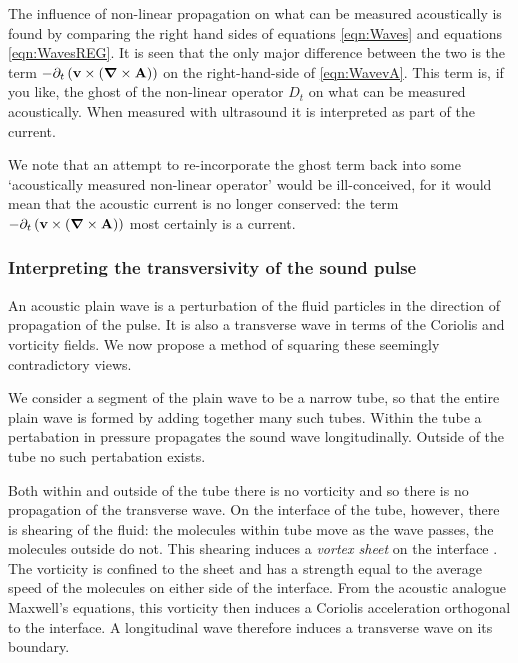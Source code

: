 \documentclass[10pt, fleqn,final,showtrims,oldfontcommands]{article} %
\newcommand{\eqnref}[1]{\ref{eqn:#1}}
\newcommand{\lr}[1]{\left( #1 \right)}
\renewcommand{\d}{\partial}
\newcommand{\del}{\nabla}
\newcommand{\vdel}{ \mbox{\boldmath $\del$}}
\newcommand{\dt}{{\d_t}}
\newcommand{\Dt}{D_t}
\newcommand{\vA}{\textbf{A}}
\newcommand{\vv}{\textbf{v}}
\begin{document}
The influence of non-linear propagation on what can be measured acoustically is found by comparing the right hand sides of equations \eqnref{Waves} and equations \eqnref{WavesREG}.
It is seen that the only major difference between the two is the term $- \dt \lr{ \vv \times \lr{\vdel \times \vA}}$ on the right-hand-side of \eqnref{WavevA}.
This term is, if you like, the ghost of the non-linear operator $\Dt$ on what can be measured acoustically.
When measured with ultrasound it is interpreted  as part of the current.

We note that an attempt to re-incorporate the ghost  term back into some `acoustically measured non-linear operator' would be ill-conceived, 
for it would mean that the acoustic current is no longer conserved:
the term $- \dt \lr{ \vv \times \lr{\vdel \times \vA}}$ most certainly is a current.






\subsubsection{Interpreting the transversivity of the sound pulse} \label{sec:transversivity}


An acoustic plain wave is  a  perturbation of the fluid particles in the direction of propagation of the pulse.
It is also a transverse wave in terms of the Coriolis and vorticity fields.
We now propose a method of squaring these seemingly contradictory views.

We consider a segment of the plain wave to be a narrow tube,
so that the entire plain wave is formed by adding together many such tubes.
Within the tube a pertabation in pressure propagates the sound wave longitudinally.
Outside of the tube no such pertabation exists.

Both within and outside of the tube  there is no vorticity and so there is no propagation of the transverse wave.
On the interface of the tube, however, there is shearing of the fluid:
the molecules  within tube move as the wave passes, the molecules outside do not.
This shearing induces a {\em vortex sheet} on the interface \cite{Howe1998}.
The vorticity is confined to the sheet 
and has a strength equal to the average speed of the molecules on either side of the interface.
From the acoustic analogue Maxwell's equations, this vorticity then induces a Coriolis acceleration orthogonal to the interface.
A longitudinal wave therefore  induces a transverse wave on its boundary.
\end{document}
